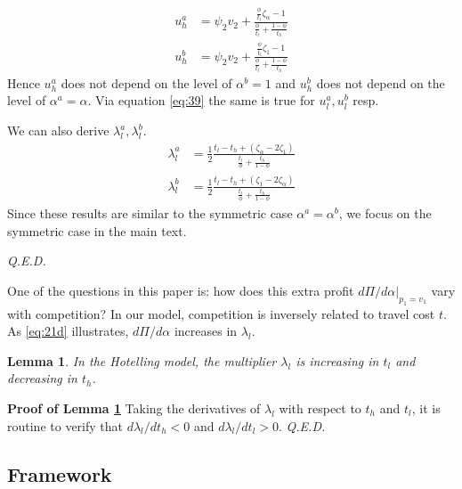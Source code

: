 \documentclass[a4paper,12pt]{article}
\newtheorem{lemma}{Lemma}
\newcommand{\qed}{\hspace*{\fill} {\em Q.E.D.}}
\begin{document}
\begin{align}
\label{eq:47}
u_h^a &= \psi_2 v_2 + \frac{\frac{\phi}{t_l} \zeta_{\alpha} -1}{\frac{\phi}{t_l}+\frac{1-\phi}{t_h}} \\
\label{eq:47b}
u_h^b &= \psi_2 v_2 + \frac{\frac{\phi}{t_l} \zeta_{1} -1}{\frac{\phi}{t_l}+\frac{1-\phi}{t_h}}
\end{align}
Hence \(u_h^a\) does not depend on the level of \(\alpha^b =1\) and \(u_h^b\) does not depend on the level of \(\alpha^a =\alpha\). Via equation \eqref{eq:39} the same is true for \(u_l^a,u_l^b\) resp.

We can also derive \(\lambda_{l}^a,\lambda_{l}^b\).
\begin{align}
\label{eq:48}
\lambda_{l}^a &= \frac{1}{2} \frac{t_l - t_h + (\zeta_{\alpha} - 2\zeta_1)}{\frac{t_l}{\phi}+\frac{t_h}{1-\phi}} \\
\label{eq:48b}
\lambda_{l}^b &= \frac{1}{2} \frac{t_l - t_h + (\zeta_{1} - 2\zeta_{\alpha})}{\frac{t_l}{\phi}+\frac{t_h}{1-\phi}}
\end{align}
Since these results are similar to the symmetric case \(\alpha^a=\alpha^b\), we focus on the symmetric case in the main text.

 \qed

One of the questions in this paper is: how does this extra profit \(d\Pi/d\alpha|_{p_1=v_1}\) vary with competition? In our model, competition is inversely related to travel cost \(t\). As \eqref{eq:21d} illustrates, \(d\Pi/d\alpha\) increases in \(\lambda_l\).

\begin{lemma}
\label{Hotelling_lambda}
In the Hotelling model, the multiplier \(\lambda_l\) is increasing in \(t_l\) and decreasing in \(t_h\).
\end{lemma}

\textbf{Proof of Lemma \ref{Hotelling_lambda}}
Taking the derivatives of \(\lambda_l\) with respect to \(t_h\) and \(t_l\), it is routine to verify that \(d\lambda_l/d t_h <0\) and \(d\lambda_l/dt_l > 0\). 
 \qed

\subsection{Framework}
\label{sec:orgecd340e}
\end{document}
